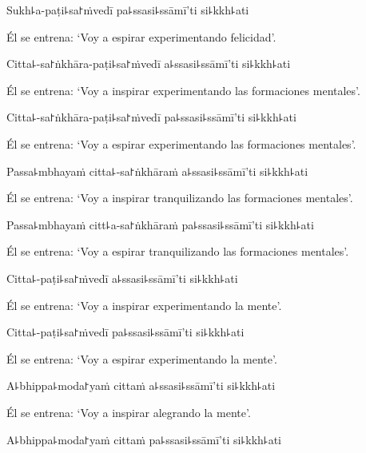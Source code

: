 Sukh꜕a-paṭi꜕sa꜓ṁvedī pa꜕ssasi꜕ssāmī'ti si꜕kkh꜕ati

\begin{english}
  Él se entrena: `Voy a espirar experimentando felicidad'.
\end{english}

Citta꜕-sa꜓ṅkhāra-paṭi꜕sa꜓ṁvedī a꜕ssasi꜕ssāmī'ti si꜕kkh꜕ati

\begin{english}
  Él se entrena: `Voy a inspirar experimentando las formaciones mentales'.
\end{english}

Citta꜕-sa꜓ṅkhāra-paṭi꜕sa꜓ṁvedī pa꜕ssasi꜕ssāmī'ti si꜕kkh꜕ati

\begin{english}
  Él se entrena: `Voy a espirar experimentando las formaciones mentales'.
\end{english}

Passa꜕mbhayaṁ citta꜕-sa꜓ṅkhāraṁ a꜕ssasi꜕ssāmī'ti si꜕kkh꜕ati

\begin{english}
  Él se entrena: `Voy a inspirar tranquilizando las formaciones mentales'.
\end{english}

Passa꜕mbhayaṁ citt꜕a-sa꜓ṅkhāraṁ pa꜕ssasi꜕ssāmī'ti si꜕kkh꜕ati

\begin{english}
  Él se entrena: `Voy a espirar tranquilizando las formaciones mentales'.
\end{english}

Citta꜕-paṭi꜕sa꜓ṁvedī a꜕ssasi꜕ssāmī'ti si꜕kkh꜕ati

\begin{english}
  Él se entrena: `Voy a inspirar experimentando la mente'.
\end{english}

Citta꜕-paṭi꜕sa꜓ṁvedī pa꜕ssasi꜕ssāmī'ti si꜕kkh꜕ati

\begin{english}
  Él se entrena: `Voy a espirar experimentando la mente'.
\end{english}

A꜕bhippa꜕moda꜓yaṁ cittaṁ a꜕ssasi꜕ssāmī'ti si꜕kkh꜕ati

\begin{english}
  Él se entrena: `Voy a inspirar alegrando la mente'.
\end{english}

A꜕bhippa꜕moda꜓yaṁ cittaṁ pa꜕ssasi꜕ssāmī'ti si꜕kkh꜕ati

